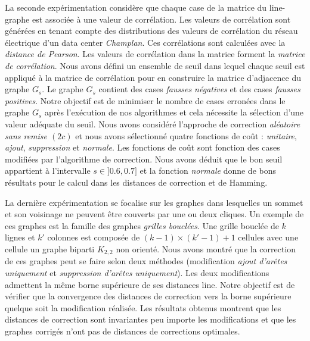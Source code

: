 La seconde exp\'erimentation consid\`ere que chaque case de la matrice du line-graphe est associ\'ee \`a une valeur de corr\'elation.  Les valeurs de corr\'elation sont g\'en\'er\'ees en tenant compte des distributions des valeurs de corr\'elation  du r\'eseau \'electrique d'un data center {\em Champlan}. Ces corr\'elations sont calcul\'ees avec la {\em distance de Pearson}. Les valeurs de corr\'elation dans la matrice forment la {\em matrice de corr\'elation}. Nous avons d\'efini un ensemble de seuil dans lequel chaque seuil est appliqu\'e \`a la matrice de corr\'elation pour en construire la matrice d'adjacence du graphe $G_s$. Le graphe $G_s$ contient des cases {\em fausses n\'egatives} et des cases {\em fausses positives}. 
Notre objectif est de minimiser le nombre de cases erron\'ees dans le graphe $G_s$ apr\`es l'ex\'ecution de nos algorithmes et cela n\'ecessite la s\'election d'une valeur ad\'equate du seuil. 
Nous avons consid\'er\'e l'approche de correction  {\em al\'eatoire sans remise $(2c)$} et nous avons s\'electionn\'e quatre fonctions de co\^ut : {\em unitaire}, {\em ajout}, {\em suppression} et {\em normale}. Les fonctions de co\^ut sont fonction des cases modifi\'ees par l'algorithme de correction.
Nous avons d\'eduit que le bon seuil appartient \`a l'intervalle $s \in ]0.6,0.7]$ et la fonction {\em normale} donne de bons r\'esultats pour le calcul dans les distances de correction et de Hamming.
\newline

La derni\`ere exp\'erimentation se focalise sur les graphes dans lesquelles un sommet et son voisinage ne peuvent \^etre couverts par une ou deux cliques. Un exemple de ces graphes est la famille des graphes {\em grilles boucl\'ees}. Une grille boucl\'ee de  $k$  lignes et $k'$ colonnes est compos\'ee de $(k-1 )\times (k'-1) +1$ cellules avec une cellule un graphe biparti $K_{2,2}$ non orient\'e.
Nous avons montr\'e que la correction de ces graphes peut se faire selon deux m\'ethodes (modification  {\em ajout d'ar\^etes uniquement} et {\em suppression d'ar\^etes uniquement}). Les deux modifications admettent la m\^eme borne sup\'erieure de ses distances line. 
 Notre objectif est de v\'erifier que la convergence  des distances de correction  vers la borne sup\'erieure quelque soit la modification r\'ealis\'ee. 
 Les r\'esultats obtenus montrent que les distances de correction sont invariantes peu importe les modifications et que les  graphes corrig\'es n'ont pas de distances de corrections optimales. 
 \newline


